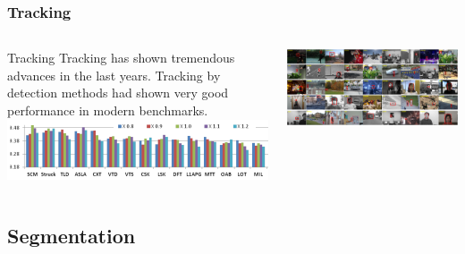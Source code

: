 \documentclass{beamer}
\begin{document}
\begin{frame}
	\frametitle{Tracking}
  \begin{columns}[T]
    \begin{column}{.5\textwidth}
		\begin{block}{Tracking}
Tracking has shown tremendous advances in the last years. 
Tracking by detection methods had shown very good performance in 
modern benchmarks.
\includegraphics[width=1.0\textwidth]{../images/trackers_performance.png}
 	
		\end{block}
    \end{column}
    \begin{column}{.5\textwidth}
		\includegraphics[width=1.0\textwidth]{../images/tr_db.png}
    \end{column}
  \end{columns}
\end{frame}

\subsection{Segmentation}
\end{document}
